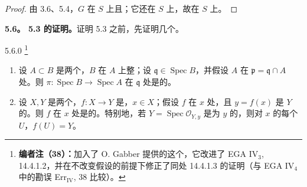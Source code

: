 \begin{proof}
由 3.6、5.4，$G$ 在 $S$ 上且；它还在 $S$ 上，故在 $S$ 上。
\end{proof}
\textbf{5.6。 5.3 的证明。}证明 5.3 之前，先证明几个。
\begin{SGAresult}{}{5.6.0}
\footnote{\textbf{编者注（38）：}加入了 O. Gabber 提供的这个，它改进了 EGA IV$_3$, 14.4.1.2，并在不改变假设的前提下修正了同处 14.4.1.3 的证明（与 EGA IV$_4$ 中的勘误 Err$_{\mathrm{IV}}$, 38 比较）。}
\begin{enumerate}
\item[(i)] 设 $A\subset B$ 是两个，$B$ 在 $A$ 上整；设 $\mathfrak q\in\operatorname{Spec}B$，并假设 $A$ 在 $\mathfrak p=\mathfrak q\cap A$ 处。则 $\pi:\operatorname{Spec}B\to\operatorname{Spec}A$ 在 $\mathfrak q$ 处是的。
\item[(ii)] 设 $X,Y$ 是两个，$f:X\to Y$ 是，$x\in X$；假设 $f$ 在 $x$ 处，且 $y=f(x)$ 是 $Y$ 的。则 $f$ 在 $x$ 处是的。特别地，若 $Y=\operatorname{Spec}\mathcal O_{Y,y}$ 是为 $y$ 的，则对 $x$ 的每个 $U$，$f(U)=Y$。
\end{enumerate}
\end{SGAresult}
